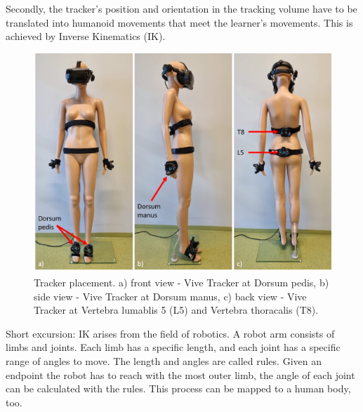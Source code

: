 Secondly, the tracker's position and orientation in the tracking volume have to be translated into humanoid movements that meet the learner's movements. This is achieved by Inverse Kinematics (IK).\\
\begin{figure}[htb]
	\centering
	\includegraphics[width=\textwidth]{figures/trackerPlacement.png}	
	\caption[Tracker placement]{Tracker placement. a) front view - Vive Tracker at Dorsum pedis, b) side view - Vive Tracker at Dorsum manus, c) back view - Vive Tracker at Vertebra lumablis 5 (L5) and Vertebra thoracalis (T8).}
	\label{fig:tracker_placement}
\end{figure}
Short excursion: IK arises from the field of robotics. A robot arm consists of limbs and joints. Each limb has a specific length, and each joint has a specific range of angles to move. The length and angles are called rules. Given an endpoint the robot has to reach with the most outer limb, the angle of each joint can be calculated with the rules. This process can be mapped to a human body, too.\\


